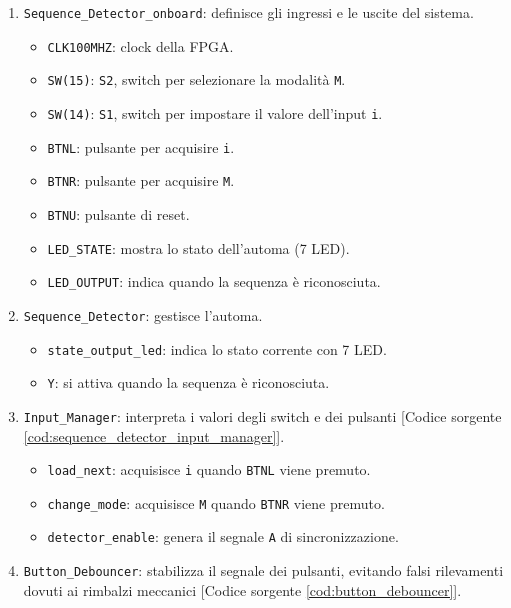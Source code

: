 \begin{enumerate}
    \item \texttt{Sequence\_Detector\_onboard}: definisce gli ingressi e le uscite del sistema.
    \begin{itemize}
        \item \texttt{CLK100MHZ}: clock della FPGA.
        \item \texttt{SW(15)}: \texttt{S2}, switch per selezionare la modalità \texttt{M}.
        \item \texttt{SW(14)}: \texttt{S1}, switch per impostare il valore dell'input \texttt{i}.
        \item \texttt{BTNL}: pulsante per acquisire \texttt{i}.
        \item \texttt{BTNR}: pulsante per acquisire \texttt{M}.
        \item \texttt{BTNU}: pulsante di reset.
        \item \texttt{LED\_STATE}: mostra lo stato dell'automa (7 LED).
        \item \texttt{LED\_OUTPUT}: indica quando la sequenza è riconosciuta.
    \end{itemize}
    \item \texttt{Sequence\_Detector}: gestisce l'automa.
    \begin{itemize}
        \item \texttt{state\_output\_led}: indica lo stato corrente con 7 LED.
        \item \texttt{Y}: si attiva quando la sequenza è riconosciuta.
    \end{itemize}
    \item \texttt{Input\_Manager}: interpreta i valori degli switch e dei pulsanti [Codice sorgente \ref{cod:sequence_detector_input_manager}].
    \begin{itemize}
        \item \texttt{load\_next}: acquisisce \texttt{i} quando \texttt{BTNL} viene premuto.
        \item \texttt{change\_mode}: acquisisce \texttt{M} quando \texttt{BTNR} viene premuto.
        \item \texttt{detector\_enable}: genera il segnale \texttt{A} di sincronizzazione.
    \end{itemize}
    \item \texttt{Button\_Debouncer}: stabilizza il segnale dei pulsanti, evitando falsi rilevamenti dovuti ai rimbalzi meccanici [Codice sorgente \ref{cod:button_debouncer}].
\end{enumerate}

